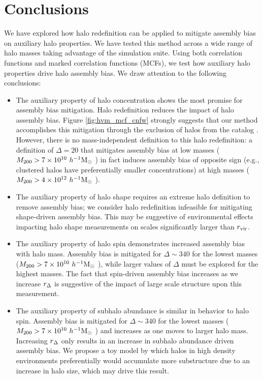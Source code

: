 \documentclass[usenatbib,fleqn]{mnras}
\begin{document}
\section[]{Conclusions}
\label{section:conclusions}
We have explored how halo redefinition can be applied to mitigate assembly bias on auxiliary halo properties. We have tested this method across a wide range of halo masses taking advantage of the \citet{diemer_kravtsov15} simulation suite. Using both correlation functions and marked correlation functions (MCFs), we test how auxiliary halo properties drive halo assembly bias. We draw attention to the following conclusions:
\begin{itemize}
    \item The auxiliary property of halo concentration  shows the most promise for assembly bias mitigation. Halo redefinition reduces the impact of halo assembly bias. Figure \ref{fig:hvm_mcf_cnfw} strongly suggests that our method accomplishes this mitigation through the exclusion of halos from the catalog . However, there is no mass-independent definition to this halo redefinition: a definition of $\Delta=20$ that mitigates assembly bias at low masses ($M_{200} > 7\times10^{10}\ h^{-1}\mathrm{M}_{\odot}~$) in fact induces assembly bias of opposite sign (e.g., clustered halos have preferentially smaller concentrations) at high masses ($M_{200} > 4\times10^{12}\ h^{-1}\mathrm{M}_{\odot}~$).
    \item The auxiliary property of halo shape requires an extreme halo definition to remove assembly bias; we consider halo redefinition infeasible for mitigating shape-driven assembly bias. This may be suggestive of environmental effects impacting halo shape measurements on scales significantly larger than $r_{\mathrm{vir}}$.
    \item The auxiliary property of halo spin demonstrates increased assembly bias with halo mass. Assembly bias is mitigated for $\Delta \sim 340$ for the lowest masses ($M_{200} > 7\times10^{10}\ h^{-1}\mathrm{M}_{\odot}~$), while larger values of $\Delta$ must be explored for the highest masses. The fact that spin-driven assembly bias increases as we increase $r_{\Delta}$ is suggestive of the impact of large scale structure upon this measurement.
    \item The auxiliary property of subhalo abundance is similar in behavior to halo spin. Assembly bias is mitigated for $\Delta \sim 340$ for the lowest masses ($M_{200} > 7\times10^{10}\ h^{-1}\mathrm{M}_{\odot}~$) and increases as one moves to larger halo mass. Increasing $r_{\Delta}$ only results in an increase in subhalo abundance driven assembly bias. We propose a toy model by which halos in high density environments preferentially would accumulate more substructure due to an increase in halo size, which may drive this result.

\end{itemize}
\end{document}
